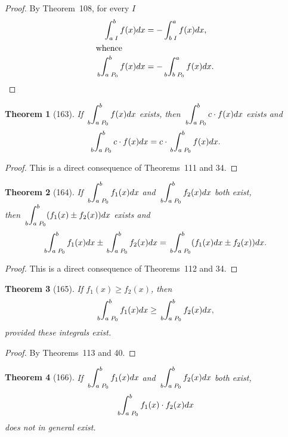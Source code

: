 \documentclass[a4paper,12pt]{book}[2004/02/16]
\providecommand{\geqq}{\geq}
\providecommand{\hyperlink}[2]{#2}
\providecommand{\hypertarget}[2]{#2}
\theoremstyle{ilemma}
\theoremstyle{itheorem}
\newtheorem{theorem}{Theorem}
\theoremstyle{iother}
\theoremstyle{icorollary}
\theoremstyle{numcorollary}
\theoremstyle{idefinition}
\begin{document}
\begin{proof}
By Theorem~\hyperlink{thm108}{108}, for every $I$
\begin{align*}
  \int_{a\; I}^b f(x)dx
  &=-\int_{b\; I}^a f(x)dx,
\\
\intertext{whence}
   \sideset{_b}{_{a\; P_0}^b}\int f(x)dx
  &=-\sideset{_b}{_{b\; P_0}^a}\int f(x)dx.\qedhere
\end{align*}
\end{proof}

\begin{theorem}[163]\hypertarget{thm163}{}
If
$\sideset{_b}{_{a\; P_0}^b}\int f(x)dx$ exists, then
$\sideset{_b}{_{a\; P_0}^b}\int c\cdot f(x)dx$ exists
and
\[
         \sideset{_b}{_{a\; P_0}^b}\int c\cdot f(x)dx
= c\cdot \sideset{_b}{_{a\; P_0}^b}\int f(x)dx.
\]
\end{theorem}

\begin{proof}
This is a direct consequence of Theorems~111 and 34.
\end{proof}

\begin{theorem}[164]\hypertarget{thm164}{}
If
$\sideset{_b}{_{a\; P_0}^b}\int f_1(x)dx$ and
$\sideset{_b}{_{a\; P_0}^b}\int f_2(x)dx$ both exist,\\
then
$\sideset{_b}{_{a\; P_0}^b}\int (f_1(x) \pm f_2(x)) dx$ exists and
\[
  \sideset{_b}{_{a\; P_0}^b}\int f_1(x)dx \pm
  \sideset{_b}{_{a\; P_0}^b}\int f_2(x)dx
= \sideset{_b}{_{a\; P_0}^b}\int (f_1(x)dx \pm f_2(x)) dx.
\]
\end{theorem}
\begin{proof}
This is a direct consequence of Theorems~112 and 34.
\end{proof}

\begin{theorem}[165]\hypertarget{thm165}{}
If $f_1(x) \geqq f_2(x)$, then
\[
      \sideset{_b}{_{a\; P_0}^b}\int f_1(x)dx
\geqq \sideset{_b}{_{a\; P_0}^b}\int f_2(x)dx,
\]
provided these integrals exist.
\end{theorem}

\begin{proof}
By Theorems~113 and 40.
\end{proof}

\begin{theorem}[166]\hypertarget{thm166}{}
If
$\sideset{_b}{_{a\; P_0}^b}\int f_1(x)dx$ and
$\sideset{_b}{_{a\; P_0}^b}\int f_2(x)dx$ both exist,
\[
  \sideset{_b}{_{a\; P_0}^b}\int f_1(x) \cdot f_2(x)dx
\]
does not in general exist.
\end{theorem}
\end{document}

